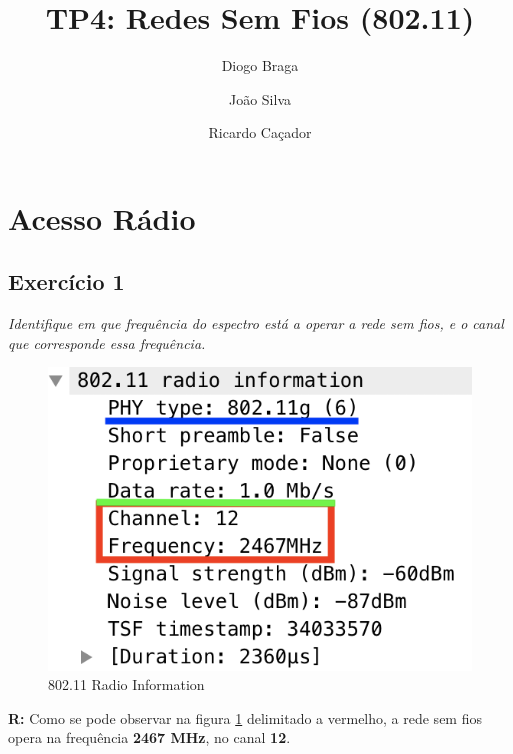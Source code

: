 \documentclass{llncs}
\begin{document}
\mainmatter
\title{TP4: Redes Sem Fios (802.11)}


\author{Diogo Braga \and João Silva \and Ricardo Caçador}



\date{}


\maketitle

\section{Acesso Rádio}

\subsection{Exercício 1}
\emph{Identifique em que frequência do espectro está a operar a rede sem fios, e o canal que corresponde essa frequência.}

\begin{figure}[H]
\begin{center}
\includegraphics[scale=0.45]{1.png} 
\end{center}
\caption{\label{fig:1}802.11 Radio Information}
\end{figure} 
\par
\textbf{R:} Como se pode observar na figura \ref{fig:1} delimitado a vermelho, a rede sem fios opera na frequência \textbf{2467 MHz}, no canal \textbf{12}.
\end{document}
